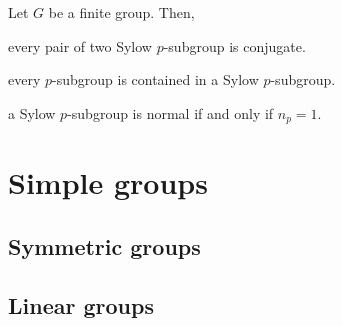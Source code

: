 \documentclass{../exp}
\begin{document}
\begin{cor}
Let $G$ be a finite group.
Then,
\begin{cond}
\item every pair of two Sylow $p$-subgroup is conjugate.
\item every $p$-subgroup is contained in a Sylow $p$-subgroup.
\item a Sylow $p$-subgroup is normal if and only if $n_p=1$.
\end{cond}
\end{cor}





\section{Simple groups}

\subsection{Symmetric groups}

\subsection{Linear groups}
\end{document}
